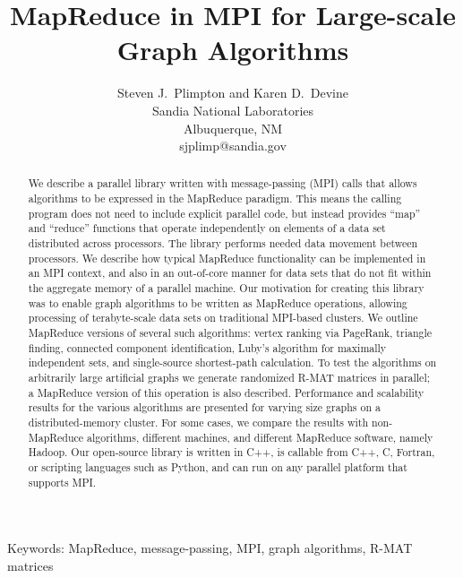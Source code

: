 \documentclass[11pt]{article}
\begin{document}
\title{Map{R}educe in {MPI} for Large-scale Graph Algorithms}

\author{
Steven J.~Plimpton and Karen D.~Devine \\
Sandia National Laboratories \\
Albuquerque, NM \\
sjplimp@sandia.gov
}

\date{}

\maketitle

\centerline{Keywords: MapReduce, message-passing, MPI, graph
algorithms, R-MAT matrices}

\vspace*{0.4in}

\begin{abstract}

We describe a parallel library written with message-passing (MPI)
calls that allows algorithms to be expressed in the MapReduce
paradigm.  This means the calling program does not need to include
explicit parallel code, but instead provides ``map'' and ``reduce''
functions that operate independently on elements of a data set
distributed across processors.  The library performs needed data
movement between processors.  We describe how typical MapReduce
functionality can be implemented in an MPI context, and also in an
out-of-core manner for data sets that do not fit within the aggregate
memory of a parallel machine.  Our motivation for creating this
library was to enable graph algorithms to be written as MapReduce
operations, allowing processing of terabyte-scale data sets on 
traditional MPI-based clusters.  We
outline MapReduce versions of several such algorithms: vertex ranking
via PageRank, triangle finding, connected component identification,
Luby's algorithm for maximally independent sets, and single-source
shortest-path calculation.  To test the algorithms on arbitrarily
large artificial graphs we generate randomized R-MAT matrices in
parallel; a MapReduce version of this operation is also described.
Performance and scalability results for the various algorithms are
presented for varying size graphs on a distributed-memory cluster.
For some cases, we compare the results with non-MapReduce algorithms,
different machines, and different MapReduce software, namely Hadoop.
Our open-source library is written in C++, is callable from C++, C,
Fortran, or scripting languages such as Python, and can run on any
parallel platform that supports MPI.

\end{abstract}

\pagebreak











\end{document}
